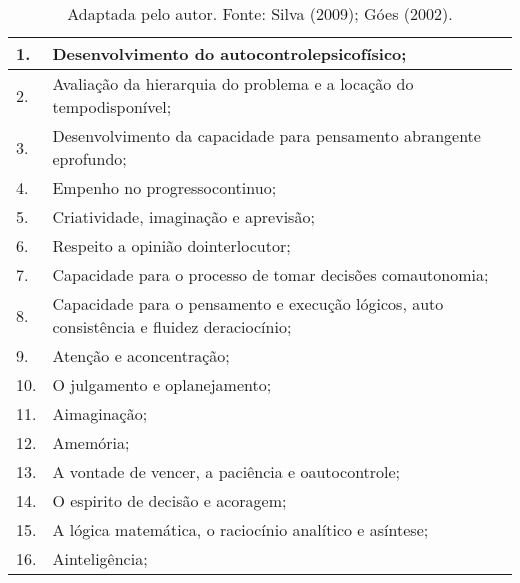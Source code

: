 \documentclass[article,12pt,onesidea,4paper,english,brazil]{abntex2}
\begin{document}
\begin{table}[]
	\centering
	\caption{Adaptada pelo autor. Fonte: Silva (2009); Góes (2002).}
	\label{my-label}
	\begin{tabular}{|l|l|}
		\hline
		1.  & Desenvolvimento do autocontrolepsicofísico;                                                \\ \hline
		2.  & Avaliação da hierarquia do problema e a locação do tempodisponível;                        \\ \hline
		3.  & Desenvolvimento da capacidade para pensamento abrangente eprofundo;                        \\ \hline
		4.  & Empenho no progressocontinuo;                                                              \\ \hline
		5.  & Criatividade, imaginação e aprevisão;                                                      \\ \hline
		6.  & Respeito a opinião dointerlocutor;                                                         \\ \hline
		7.  & Capacidade para o processo de tomar decisões comautonomia;                                 \\ \hline
		8.  & Capacidade para o pensamento e execução lógicos, auto consistência e fluidez deraciocínio; \\ \hline
		9.  & Atenção e aconcentração;                                                                   \\ \hline
		10. & O julgamento e oplanejamento;                                                              \\ \hline
		11. & Aimaginação;                                                                               \\ \hline
		12. & Amemória;                                                                                  \\ \hline
		13. & A vontade de vencer, a paciência e oautocontrole;                                          \\ \hline
		14. & O espirito de decisão e acoragem;                                                          \\ \hline
		15. & A lógica matemática, o raciocínio analítico e asíntese;                                    \\ \hline
		16. & Ainteligência;                                                                             \\ \hline

\end{tabular}
\end{table}
\end{document}
